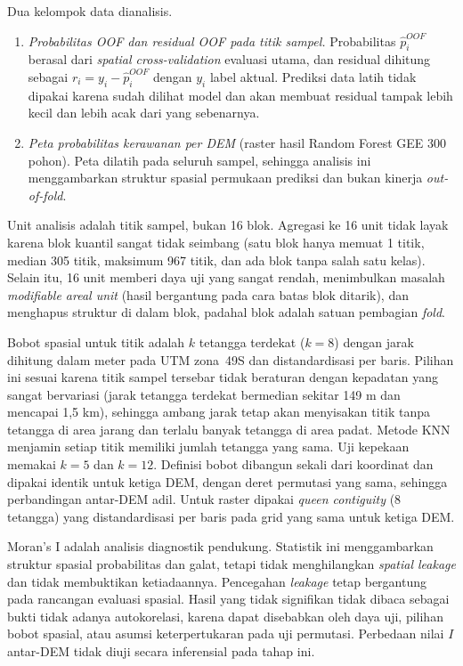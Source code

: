 \documentclass[12pt,a4paper]{article}
\begin{document}
Dua kelompok data dianalisis.
\begin{enumerate}
\item \textit{Probabilitas OOF dan residual OOF pada titik sampel.}
      Probabilitas $\hat{p}_i^{OOF}$ berasal dari \textit{spatial
      cross-validation} evaluasi utama, dan residual dihitung sebagai
      $r_i=y_i-\hat{p}_i^{OOF}$ dengan $y_i$ label aktual. Prediksi data
      latih tidak dipakai karena sudah dilihat model dan akan membuat
      residual tampak lebih kecil dan lebih acak dari yang sebenarnya.
\item \textit{Peta probabilitas kerawanan per DEM} (raster hasil Random
      Forest GEE 300 pohon). Peta dilatih pada seluruh sampel, sehingga
      analisis ini menggambarkan struktur spasial permukaan prediksi dan
      bukan kinerja \textit{out-of-fold}.
\end{enumerate}

Unit analisis adalah titik sampel, bukan 16 blok. Agregasi ke 16 unit tidak
layak karena blok kuantil sangat tidak seimbang (satu blok hanya memuat 1
titik, median 305 titik, maksimum 967 titik, dan ada blok tanpa salah satu
kelas). Selain itu, 16 unit memberi daya uji yang sangat rendah, menimbulkan
masalah \textit{modifiable areal unit} (hasil bergantung pada cara batas
blok ditarik), dan menghapus struktur di dalam blok, padahal blok adalah
satuan pembagian \textit{fold}.

Bobot spasial untuk titik adalah $k$ tetangga terdekat ($k=8$) dengan jarak
dihitung dalam meter pada UTM zona~49S dan distandardisasi per baris. Pilihan
ini sesuai karena titik sampel tersebar tidak beraturan dengan kepadatan yang
sangat bervariasi (jarak tetangga terdekat bermedian sekitar 149 m dan
mencapai 1,5 km), sehingga ambang jarak tetap akan menyisakan titik tanpa
tetangga di area jarang dan terlalu banyak tetangga di area padat. Metode
KNN menjamin setiap titik memiliki jumlah tetangga yang sama. Uji kepekaan
memakai $k=5$ dan $k=12$. Definisi bobot dibangun sekali dari koordinat dan
dipakai identik untuk ketiga DEM, dengan deret permutasi yang sama, sehingga
perbandingan antar-DEM adil. Untuk raster dipakai \textit{queen contiguity}
(8 tetangga) yang distandardisasi per baris pada grid yang sama untuk ketiga
DEM.

Moran's I adalah analisis diagnostik pendukung. Statistik ini menggambarkan
struktur spasial probabilitas dan galat, tetapi tidak menghilangkan
\textit{spatial leakage} dan tidak membuktikan ketiadaannya. Pencegahan
\textit{leakage} tetap bergantung pada rancangan evaluasi spasial. Hasil yang
tidak signifikan tidak dibaca sebagai bukti tidak adanya autokorelasi, karena
dapat disebabkan oleh daya uji, pilihan bobot spasial, atau asumsi
keterpertukaran pada uji permutasi. Perbedaan nilai $I$ antar-DEM tidak diuji
secara inferensial pada tahap ini.
\end{document}
